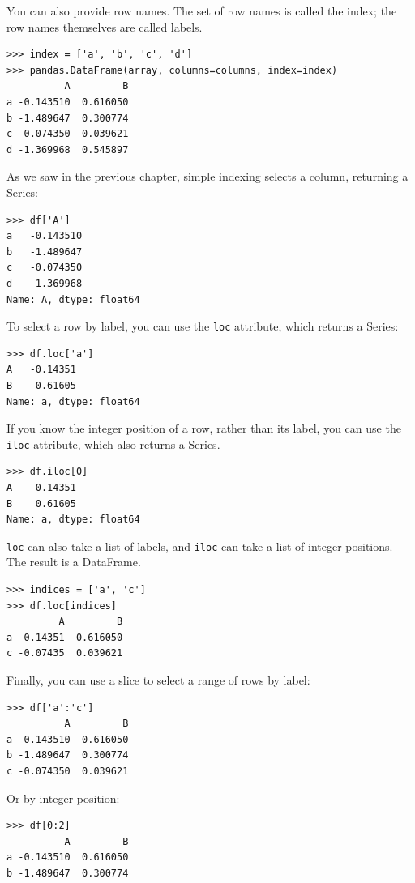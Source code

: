 \documentclass[12pt]{book}
\begin{document}
You can also provide row names.  The set of row names is called the
index; the row names themselves are called labels.

\begin{verbatim}
>>> index = ['a', 'b', 'c', 'd']
>>> pandas.DataFrame(array, columns=columns, index=index)
          A         B
a -0.143510  0.616050
b -1.489647  0.300774
c -0.074350  0.039621
d -1.369968  0.545897
\end{verbatim}

As we saw in the previous chapter, simple indexing selects a
column, returning a Series:

\begin{verbatim}
>>> df['A']
a   -0.143510
b   -1.489647
c   -0.074350
d   -1.369968
Name: A, dtype: float64
\end{verbatim}

To select a row by label, you can use the {\tt loc} attribute, which
returns a Series:

\begin{verbatim}
>>> df.loc['a']
A   -0.14351
B    0.61605
Name: a, dtype: float64
\end{verbatim}

If you know the integer position of a row, rather than its label, you
can use the {\tt iloc} attribute, which also returns a Series.

\begin{verbatim}
>>> df.iloc[0]
A   -0.14351
B    0.61605
Name: a, dtype: float64
\end{verbatim}

{\tt loc} can also take a list of labels, and {\tt iloc} can take a list 
of integer positions.  The result is a DataFrame.

\begin{verbatim}
>>> indices = ['a', 'c']
>>> df.loc[indices]
         A         B
a -0.14351  0.616050
c -0.07435  0.039621
\end{verbatim}

Finally, you can use a slice to select a range of rows by label:

\begin{verbatim}
>>> df['a':'c']
          A         B
a -0.143510  0.616050
b -1.489647  0.300774
c -0.074350  0.039621
\end{verbatim}

Or by integer position:

\begin{verbatim}
>>> df[0:2]
          A         B
a -0.143510  0.616050
b -1.489647  0.300774
\end{verbatim}
\end{document}
